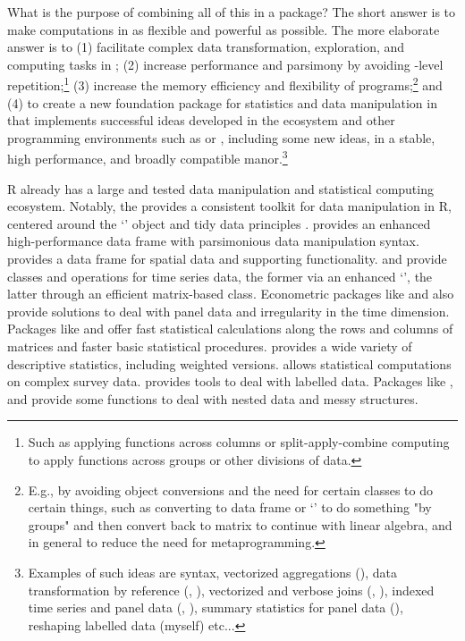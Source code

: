 \documentclass[nojss]{jss} %
\newcommand{\class}[1]{`\code{#1}'}
\begin{document}
What is the purpose of combining all of this in a package? The short answer is to make computations in  as flexible and powerful as possible. The more elaborate answer is to (1) facilitate complex data transformation, exploration, and computing tasks in ; (2) increase performance and parsimony by avoiding -level repetition;\footnote{Such as applying  functions across columns or split-apply-combine computing to apply functions across groups or other divisions of data.} (3) increase the memory efficiency and flexibility of  programs;\footnote{E.g., by avoiding object conversions and the need for certain classes to do certain things, such as converting to data frame or \class{data.table} to do something "by groups" and then convert back to matrix to continue with linear algebra, and in general to reduce the need for metaprogramming.} and (4) to create a new foundation package for statistics and data manipulation in  that implements successful ideas developed in the  ecosystem and other programming environments such as  or  \citep{STATA}, including some new ideas, in a stable, high performance, and broadly compatible manor.\footnote{Examples of such ideas are  syntax, vectorized aggregations (), data transformation by reference (, ), vectorized and verbose joins (, ), indexed time series and panel data (, ), summary statistics for panel data (), reshaping labelled data (myself) etc...} \newline

R already has a large and tested data manipulation and statistical computing ecosystem. Notably, the  \citep{rtidyverse} provides a consistent toolkit for data manipulation in R, centered around the \class{tibble} \citep{rtibble} object and tidy data principles \citep{rtidydata}.  \citep{rdatatable} provides an enhanced high-performance data frame with parsimonious data manipulation syntax.  \citep{rsf} provides a data frame for spatial data and supporting functionality.  \citep{rtsibble} and  \citep{rxts} provide classes and operations for time series data, the former via an enhanced \class{tibble}, the latter through an efficient matrix-based class. Econometric packages like  \citep{rplm} and  \citep{rfixest} also provide solutions to deal with panel data and irregularity in the time dimension. Packages like  \citep{rmatrixstats} and  \citep{rfast} offer fast statistical calculations along the rows and columns of matrices and faster basic statistical procedures.  \citep{rdesctools} provides a wide variety of descriptive statistics, including weighted versions.  \citep{rsurvey} allows statistical computations on complex survey data.  \citep{rlabelled} provides tools to deal with labelled data. Packages like  \citep{rtidyr},  \citep{rpurrr} and  \citep{rrapply} provide some functions to deal with nested data and messy structures. \newline
\end{document}
